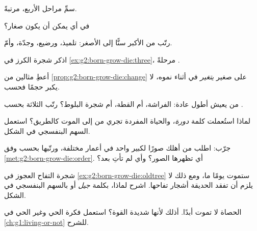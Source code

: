 \begin{exercise}[$\star$]\label{exo:g2:born-grow-die:1}
سمِّ مراحل  الأربع، مرتبةً.
\end{exercise}

\begin{exercise}[$\star$]\label{exo:g2:born-grow-die:2}
في أي  يمكن أن يكون  صغار؟
\end{exercise}

\begin{exercise}[$\star$]\label{exo:g2:born-grow-die:3}
رتّب من الأكبر سنًّا إلى الأصغر: تلميذ، ورضيع، وجدّة، وأمّ.
\end{exercise}

\begin{exercise}[$\star$]\label{exo:g2:born-grow-die:4}
اذكر  شجرة الكرز في \cref{ex:g2:born-grow-die:three}،
مرحلةً .
\end{exercise}

\begin{exercise}[$\star$]\label{exo:g2:born-grow-die:5}
أعطِ مثالين من \cref{prop:g2:born-grow-die:change} على 
صغير \emph{يتغير} في أثناء نموه، لا يكبر حجمًا فحسب.
\end{exercise}

\begin{exercise}[$\star$]\label{exo:g2:born-grow-die:6}
من يعيش أطول عادة: الفراشة، أم القطة، أم شجرة البلوط؟ رتّب
الثلاثة بحسب .
\end{exercise}

\begin{exercise}[$\star$]\label{exo:g2:born-grow-die:7}
لماذا استُعملت كلمة \emph{دورة}، والحياة المفردة تجري من 
إلى الموت كالطريق؟ استعمل السهم البنفسجي في الشكل.
\end{exercise}

\begin{exercise}[$\star$]\label{exo:g2:born-grow-die:8}
جرّب: اطلب من أهلك صورًا لكبير واحد في أعمار مختلفة، ورتّبها
بحسب  وفق \cref{met:g2:born-grow-die:order}. أي 
تظهرها الصور؟ وأي  لم تأتِ بعد؟
\end{exercise}

\begin{exercise}[$\star\star$]\label{exo:g2:born-grow-die:9}
شجرة التفاح العجوز في \cref{ex:g2:born-grow-die:oldtree} ستموت
يومًا ما، ومع ذلك لا يلزم أن تفقد الحديقة أشجار تفاحها. اشرح
لماذا، بكلمة \emph{جيل} أو بالسهم البنفسجي في الشكل.
\end{exercise}

\begin{exercise}[$\star\star$]\label{exo:g2:born-grow-die:10}
الحصاة لا تموت أبدًا. أذلك لأنها شديدة القوة؟ استعمل فكرة الحي
وغير الحي في \cref{ch:g1:living-or-not} للشرح.
\end{exercise}
